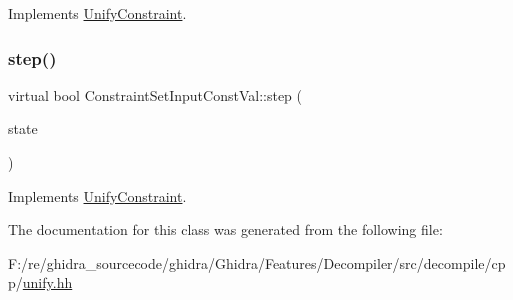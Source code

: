 Implements \mbox{\hyperlink{class_unify_constraint_a774f6a611a96384766cb8e8d8f5ff41f}{Unify\+Constraint}}.

\mbox{\label{class_constraint_set_input_const_val_a998952417cd5325d8ba5b6a912dd1b05}} 
\subsubsection{\texorpdfstring{step()}{step()}}
{\footnotesize\ttfamily virtual bool Constraint\+Set\+Input\+Const\+Val\+::step (\begin{DoxyParamCaption}\item[{\mbox{\hyperlink{class_unify_state}{Unify\+State}} \&}]{state }\end{DoxyParamCaption})\hspace{0.3cm}{\ttfamily [virtual]}}



Implements \mbox{\hyperlink{class_unify_constraint_ad9ab4ad91037f96bf803735d414d212d}{Unify\+Constraint}}.



The documentation for this class was generated from the following file\+:\begin{DoxyCompactItemize}
\item 
F\+:/re/ghidra\+\_\+sourcecode/ghidra/\+Ghidra/\+Features/\+Decompiler/src/decompile/cpp/\mbox{\hyperlink{unify_8hh}{unify.\+hh}}\end{DoxyCompactItemize}
